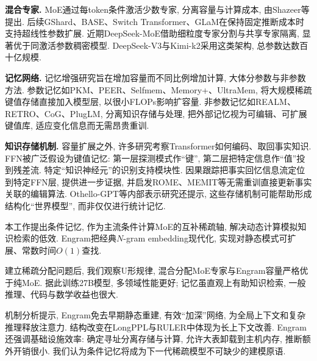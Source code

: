 \noindent\textbf{混合专家.}
MoE通过每token条件激活少数专家, 分离容量与计算成本, 由Shazeer等提出\cite{engram-shazeer2017outrageously}. 后续GShard\cite{engram-lepikhin2020gshard}、BASE\cite{engram-pmlr-v139-lewis21a}、Switch Transformer\cite{engram-fedus2022switch}、GLaM\cite{engram-du2022glam}在保持固定推断成本时支持超线性参数扩展. 近期DeepSeek-MoE\cite{engram-dai2024deepseekmoe}借助细粒度专家分割与共享专家隔离, 显著优于同激活参数稠密模型. DeepSeek-V3\cite{engram-liu2024deepseek}与Kimi-k2\cite{engram-kimi-k2}采用这类架构, 总参数达数百十亿规模.

\noindent\textbf{记忆网络.}
记忆增强研究旨在增加容量而不同比例增加计算, 大体分参数与非参数方法. 参数记忆如PKM\cite{engram-lample2019large}、PEER\cite{engram-he2024mixture}、Selfmem\cite{engram-cheng2023lift}、Memory+\cite{engram-berges2024memory}、UltraMem\cite{engram-huang2024ultra,engram-huang2025ultramemv2}, 将大规模稀疏键值存储直接加入模型层, 以很小FLOPs影响扩容量. 非参数记忆如REALM\cite{engram-guu2020retrieval}、RETRO\cite{engram-borgeaud2022improving,engram-wang2023shall}、CoG\cite{engram-lan2023copy,engram-caoretrieval}、PlugLM\cite{engram-cheng2023decouple}, 分离知识存储与处理, 把外部记忆视为可编辑、可扩展键值库, 适应变化信息而无需昂贵重训.

\noindent\textbf{知识存储机制.}
容量扩展之外, 许多研究考察Transformer如何编码、取回事实知识. FFN被广泛假设为键值记忆\cite{engram-geva2021transformer}: 第一层探测模式作“键”, 第二层把特定信息作“值”投到残差流. 特定“知识神经元”的识别\cite{engram-dai2022knowledge}支持模块性. 因果跟踪\cite{engram-meng2022locating}把事实回忆信息流定位到特定FFN层, 提供进一步证据, 并启发ROME\cite{engram-meng2022locating}、MEMIT\cite{engram-meng2022mass}等无需重训直接更新事实关联的编辑算法. Othello-GPT等内部表示研究\cite{engram-li2024emergentworldrepresentationsexploring}还提示, 这些存储机制可能帮助形成结构化“世界模型”, 而非仅仅进行统计记忆.

本工作提出条件记忆, 作为主流条件计算MoE的互补稀疏轴, 解决动态计算模拟知识检索的低效. Engram把经典$N$-gram embedding现代化, 实现对静态模式可扩展、常数时间$O(1)$查找.

建立稀疏分配问题后, 我们观察U形规律, 混合分配MoE专家与Engram容量严格优于纯MoE. 据此训练27B模型, 多领域性能更好; 记忆虽直观上有助知识检索, 一般推理、代码与数学收益也很大.

机制分析提示, Engram免去早期静态重建, 有效“加深”网络, 为全局上下文和复杂推理释放注意力. 结构改变在LongPPL与RULER中体现为长上下文改善. Engram还强调基础设施效率: 确定寻址分离存储与计算, 允许大表卸载到主机内存, 推断额外开销很小. 我们认为条件记忆将成为下一代稀疏模型不可缺少的建模原语.

